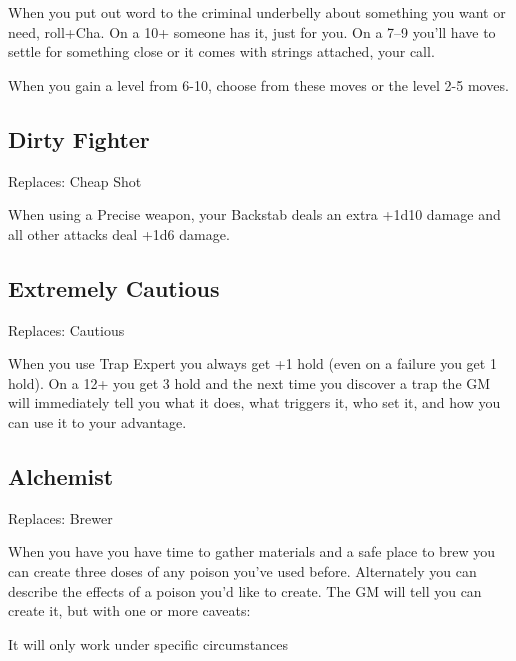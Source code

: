 When you put out word to the criminal underbelly about something you want or need, roll+Cha. On a 10+ someone has it, just for you. On a 7–9 you'll have to settle for something close or it comes with strings attached, your call.

         
\startInstructions
When you gain a level from 6-10, choose from these moves or the level 2-5 moves.
\stopInstructions
         
\subsection{Dirty Fighter}    
         

Replaces: Cheap Shot

         

When using a Precise weapon, your Backstab deals an extra +1d10 damage and all other attacks deal +1d6 damage.

         
\subsection{Extremely Cautious}    
         

Replaces: Cautious

         

When you use Trap Expert you always get +1 hold (even on a failure you get 1 hold). On a 12+ you get 3 hold and the next time you discover a trap the GM will immediately tell you what it does, what triggers it, who set it, and how you can use it to your advantage.

         
\subsection{Alchemist}   
         

Replaces: Brewer

         

When you have you have time to gather materials and a safe place to brew you can create three doses of any poison you've used before. Alternately you can describe the effects of a poison you'd like to create. The GM will tell you can create it, but with one or more caveats:

         
\startitemize[1,packed]
           
\item It will only work under specific circumstances

